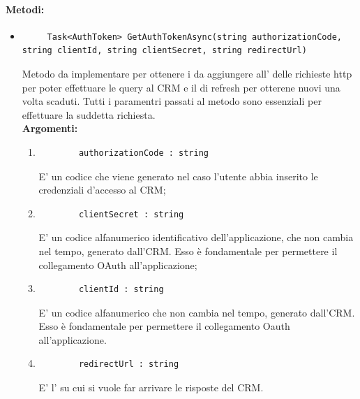 \paragraph{Metodi:}\hfill
\begin{itemize}
	\itemsep0em 	
	\item 
	\begin{lstlisting}
	 Task<AuthToken> GetAuthTokenAsync(string authorizationCode, string clientId, string clientSecret, string redirectUrl)
	\end{lstlisting}
	Metodo da implementare per ottenere i  da aggiungere all' delle richieste \gls{http} per poter effettuare le query al CRM e il  di refresh per otterene nuovi  una volta scaduti. Tutti i paramentri passati al metodo sono essenziali per effettuare la suddetta richiesta.\\
	\textbf{\small Argomenti:}
	\begin{enumerate}[leftmargin=*]
		\itemsep0em 
		\item 
		\begin{lstlisting}
		authorizationCode : string
		\end{lstlisting}
		E' un codice che viene generato nel caso l'utente abbia inserito le credenziali d'accesso al CRM;
		\item 
		\begin{lstlisting}
		clientSecret : string
		\end{lstlisting}
		E' un codice alfanumerico identificativo dell'applicazione, che non cambia nel tempo, generato dall'CRM. Esso è fondamentale per permettere il collegamento OAuth all'applicazione; 
		\item 
		\begin{lstlisting}
		clientId : string
		\end{lstlisting}
		E' un codice alfanumerico che non cambia nel tempo, generato dall'CRM. Esso è fondamentale per permettere il collegamento Oauth all'applicazione. 
		\item 
		\begin{lstlisting}
		redirectUrl : string
		\end{lstlisting}
		E' l' su cui si vuole far arrivare le risposte del CRM.
	\end{enumerate}
	

\end{itemize}
